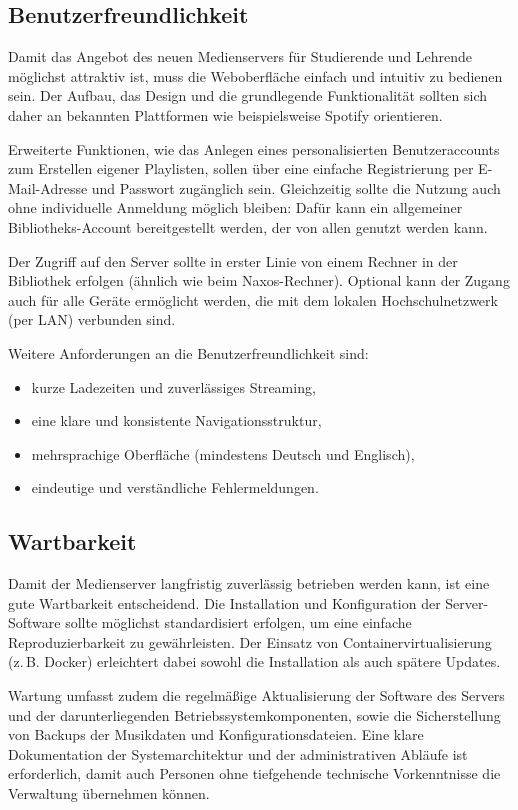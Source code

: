 \documentclass[12pt,a4paper]{report}
\begin{document}
  \subsection{Benutzerfreundlichkeit}
  Damit das Angebot des neuen Medienservers für Studierende und Lehrende möglichst attraktiv ist, muss die Weboberfläche einfach und intuitiv zu bedienen sein. 
  Der Aufbau, das Design und die grundlegende Funktionalität sollten sich daher an bekannten Plattformen wie beispielsweise Spotify orientieren.  

  Erweiterte Funktionen, wie das Anlegen eines personalisierten Benutzeraccounts zum Erstellen eigener Playlisten, 
  sollen über eine einfache Registrierung per E-Mail-Adresse und Passwort zugänglich sein.  
  Gleichzeitig sollte die Nutzung auch ohne individuelle Anmeldung möglich bleiben: Dafür kann ein allgemeiner Bibliotheks-Account bereitgestellt werden, 
  der von allen genutzt werden kann.  

  Der Zugriff auf den Server sollte in erster Linie von einem Rechner in der Bibliothek erfolgen (ähnlich wie beim Naxos-Rechner). 
  Optional kann der Zugang auch für alle Geräte ermöglicht werden, die mit dem lokalen Hochschulnetzwerk (per LAN) verbunden sind.  

  Weitere Anforderungen an die Benutzerfreundlichkeit sind:
  \begin{itemize}
    \item kurze Ladezeiten und zuverlässiges Streaming,
    \item eine klare und konsistente Navigationsstruktur,
    \item mehrsprachige Oberfläche (mindestens Deutsch und Englisch),
    \item eindeutige und verständliche Fehlermeldungen.
  \end{itemize}

  \subsection{Wartbarkeit}
  Damit der Medienserver langfristig zuverlässig betrieben werden kann, ist eine gute Wartbarkeit entscheidend. 
  Die Installation und Konfiguration der Server-Software sollte möglichst standardisiert erfolgen, um eine einfache Reproduzierbarkeit zu gewährleisten. 
  Der Einsatz von Containervirtualisierung (z.\,B. Docker) erleichtert dabei sowohl die Installation als auch spätere Updates.  

  Wartung umfasst zudem die regelmäßige Aktualisierung der Software des Servers und der darunterliegenden Betriebssystemkomponenten, 
  sowie die Sicherstellung von Backups der Musikdaten und Konfigurationsdateien.  
  Eine klare Dokumentation der Systemarchitektur und der administrativen Abläufe ist erforderlich, 
  damit auch Personen ohne tiefgehende technische Vorkenntnisse die Verwaltung übernehmen können.  
\end{document}
